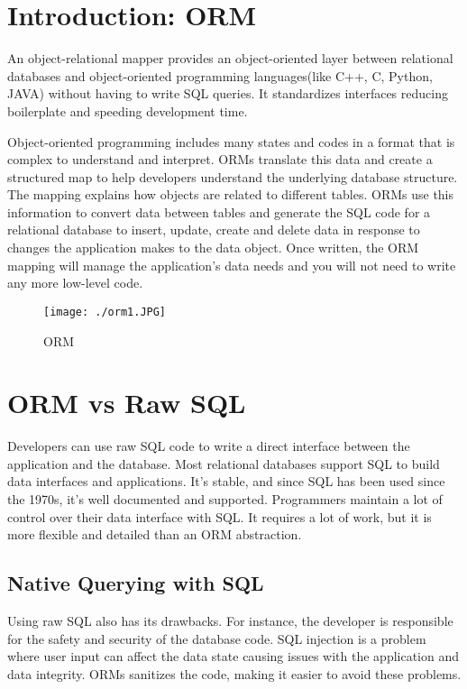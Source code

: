 \documentclass[10pt,a4paper,twoside]{article}
\begin{document}
\section{Introduction: ORM}
\item An object-relational mapper provides an object-oriented layer between relational databases and object-oriented programming languages(like C++, C, Python, JAVA) without having to write SQL queries. It standardizes interfaces reducing boilerplate and speeding development time.
\item Object-oriented programming includes many states and codes in a format that is complex to understand and interpret. ORMs translate this data and create a structured map to help developers understand the underlying database structure. The mapping explains how objects are related to different tables. ORMs use this information to convert data between tables and generate the SQL code for a relational database to insert, update, create and delete data in response to changes the application makes to the data object. Once written, the ORM mapping will manage the application’s data needs and you will not need to write any more low-level code.
\begin{figure}
  \texttt{[image: ./orm1.JPG]}
  \caption{ORM}
  \label{fig:ORM}
\end{figure}

\section{ORM vs Raw SQL}
Developers can use raw SQL code to write a direct interface between the application and the database. Most relational databases support SQL to build data interfaces and applications. It’s stable, and since SQL has been used since the 1970s, it’s well documented and supported. Programmers maintain a lot of control over their data interface with SQL. It requires a lot of work, but it is more flexible and detailed than an ORM abstraction.
\subsection{Native Querying with SQL}
\item Using raw SQL also has its drawbacks. For instance, the developer is responsible for the safety and security of the database code. SQL injection is a problem where user input can affect the data state causing issues with the application and data integrity. ORMs sanitizes the code, making it easier to avoid these problems.
\end{document}
